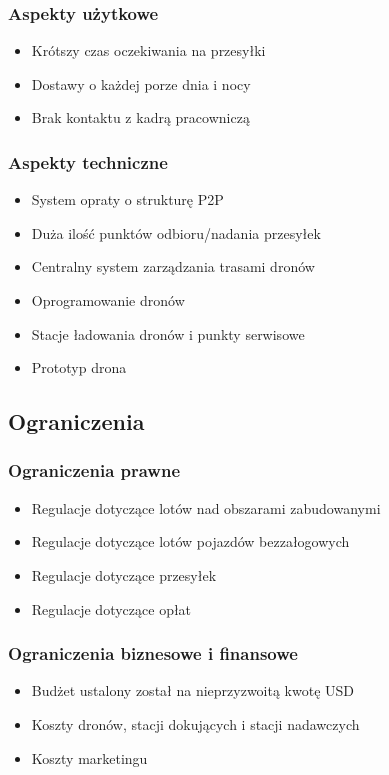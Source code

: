 \documentclass[12pt]{article}
\begin{document}
\subsubsection{Aspekty użytkowe}
\begin{itemize}
\item Krótszy czas oczekiwania na przesyłki
\item Dostawy o każdej porze dnia i nocy
\item Brak kontaktu z kadrą pracowniczą
\end{itemize}

\subsubsection{Aspekty techniczne}
\begin{itemize}
\item System opraty o strukturę P2P
\item Duża ilość punktów odbioru/nadania przesyłek
\item Centralny system zarządzania trasami dronów
\item Oprogramowanie dronów
\item Stacje ładowania dronów i punkty serwisowe
\item Prototyp drona
\end{itemize}

\subsection{Ograniczenia}
\subsubsection{Ograniczenia prawne}
\begin{itemize}
\item Regulacje dotyczące lotów nad obszarami zabudowanymi
\item Regulacje dotyczące lotów pojazdów bezzałogowych
\item Regulacje dotyczące przesyłek
\item Regulacje dotyczące opłat
\end{itemize}
\subsubsection{Ograniczenia biznesowe i finansowe}
\begin{itemize}
\item Budżet ustalony został na nieprzyzwoitą kwotę USD
\item Koszty dronów, stacji dokujących i stacji nadawczych
\item Koszty marketingu

\end{itemize}
\end{document}
